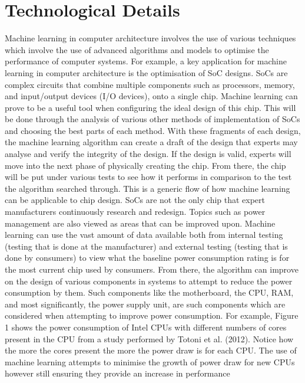 \documentclass[conference]{IEEEtran}
\begin{document}
\section{Technological Details} %
Machine learning in computer architecture involves the use of various techniques which involve the use of advanced algorithms and models to optimise the 
performance of computer systems. For example, a key application for machine learning in computer architecture is the optimisation of SoC designs. SoCs are 
complex circuits that combine multiple components such as processors, memory, and input/output devices (I/O devices), onto a single chip. Machine learning can 
prove to be a useful tool when configuring the ideal design of this chip. This will be done through the analysis of various other methods of implementation of SoCs 
and choosing the best parts of each method. With these fragments of each design, the machine learning algorithm can create a draft of the design that experts may 
analyse and verify the integrity of the design. If the design is valid, experts will move into the next phase of physically creating the chip. From there, the chip 
will be put under various tests to see how it performs in comparison to the test the algorithm searched through. This is a generic flow of how machine learning can 
be applicable to chip design. SoCs are not the only chip that expert manufacturers continuously research and redesign. Topics such as power management are also viewed 
as areas that can be improved upon. Machine learning can use the vast amount of data available both from internal testing (testing that is done at the manufacturer) and 
external testing (testing that is done by consumers) to view what the baseline power consumption rating is for the most current chip used by consumers. From there, the 
algorithm can improve on the design of various components in systems to attempt to reduce the power consumption by them. Such components like the motherboard, the CPU,
RAM, and most significantly, the power supply unit, are such components which are considered when attempting to improve power consumption. 
For example, Figure 1 shows the power consumption of Intel CPUs with different numbers of cores present in the CPU from a study performed by Totoni et al. (2012). Notice how the more the cores present the more the 
power draw is for each CPU. The use of machine learning attempts to minimise the growth of power draw for new CPUs however still ensuring they provide an increase in performance 
\end{document}
